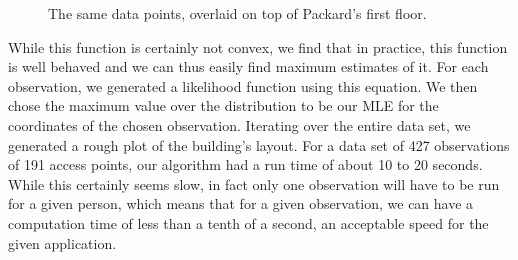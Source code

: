 \begin{figure}
\caption{The same data points, overlaid on top of Packard's first floor.}
\end{figure}

While this function is certainly not convex, we find that in practice, this 
function is well behaved and we can thus easily find maximum estimates of it.
For each observation, we generated a likelihood function using this equation.
We then chose the maximum value over the
distribution to be our MLE for the coordinates of the chosen
observation. Iterating over the entire data set, we generated a rough
plot of the building's layout.
For a data set of 427 observations of 191 access points, our algorithm
had a run time of about 10 to 20 seconds. While this certainly seems slow,
in fact only one observation will have to be run for a given person, which 
means that for a given observation, we can have a computation time of less than a
tenth of a second, an acceptable speed for the given application.
